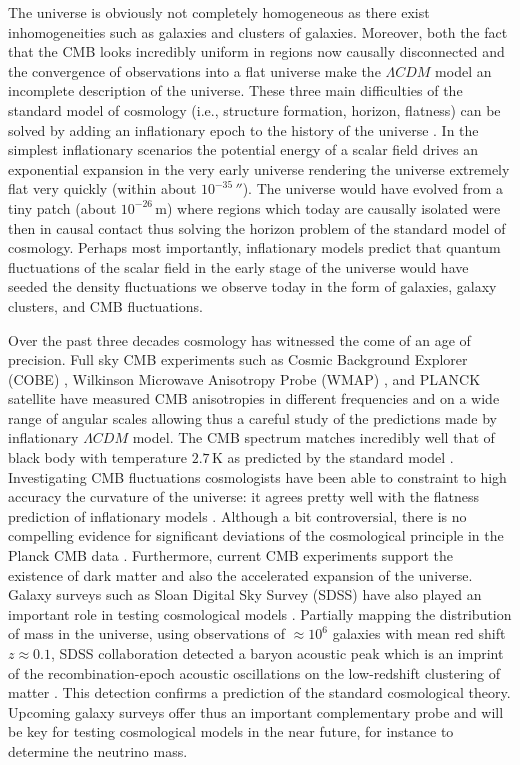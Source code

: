 The universe is obviously not completely homogeneous as there exist inhomogeneities such as galaxies and clusters of galaxies. Moreover, both the fact that the CMB looks incredibly uniform in regions now causally disconnected and the convergence of observations into a flat universe make the $\Lambda CDM$ model an incomplete description of the universe. These three main difficulties of the standard model of cosmology (i.e., structure formation, horizon, flatness) can be solved by adding an inflationary epoch to the history of the universe \cite{Guth:2005zr}. In the simplest inflationary scenarios the potential energy of a scalar field drives an exponential expansion in the very early universe rendering the universe extremely flat very quickly (within about $10^{-35}\, \second$). The universe would have evolved from a tiny patch (about $10^{-26}\,\mathrm{m}$) where regions which today are causally isolated were then in causal contact thus solving the horizon problem of the standard model of cosmology. Perhaps most importantly, inflationary models predict that quantum fluctuations of the scalar field in the early stage of the universe would have seeded the density fluctuations we observe today in the form of galaxies, galaxy clusters, and CMB fluctuations.

Over the past three decades cosmology has witnessed the come of an age of precision. Full sky CMB experiments such as Cosmic Background Explorer (COBE) \cite{Smoot:1992td}, Wilkinson Microwave Anisotropy Probe (WMAP) \cite{Bennett:2003bz}, and PLANCK satellite \cite{Ade:2013sjv} have measured CMB anisotropies in different frequencies and on a wide range of angular scales allowing thus a careful study of the predictions made by inflationary $\Lambda CDM$ model. The CMB spectrum matches incredibly well that of black body with temperature $2.7\,\mathrm{K}$ as predicted by the standard model \cite{Alpher:1950zz}. Investigating CMB fluctuations cosmologists have been able to constraint to high accuracy the curvature of the universe: it agrees pretty well with the flatness prediction of inflationary models \cite{Ade:2015xua}. Although a bit controversial, there is no compelling evidence for significant deviations of the cosmological principle in the Planck CMB data \cite{Ade:2015hxq}. Furthermore, current CMB experiments support the existence of dark matter and also the accelerated expansion of the universe. Galaxy surveys such as Sloan Digital Sky Survey (SDSS) have also played an important role in testing cosmological models \cite{Tegmark:2003uf,Tegmark:2003ud}. Partially mapping the distribution of mass in the universe, using observations of $\approx 10^6$ galaxies with mean red shift $z \approx 0.1$, SDSS collaboration detected a baryon acoustic peak which is an imprint of the recombination-epoch acoustic oscillations on the low-redshift clustering of matter \cite{Eisenstein:2005su}. This detection confirms a prediction of the standard cosmological theory. Upcoming galaxy surveys offer thus an important complementary probe and will be key for testing cosmological models in the near future, for instance to determine the neutrino mass.

